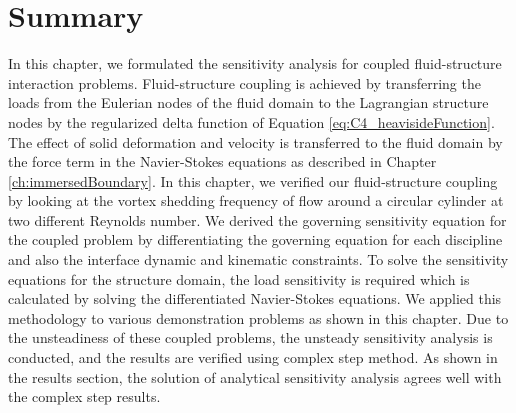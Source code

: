 \section{Summary}
In this chapter, we formulated the sensitivity analysis for coupled fluid-structure interaction problems. Fluid-structure coupling is achieved by transferring the loads from the Eulerian nodes of the fluid domain to the Lagrangian structure nodes by the regularized delta function of Equation \eqref{eq:C4_heavisideFunction}. The effect of solid deformation and velocity is transferred to the fluid domain by the force term in the Navier-Stokes equations as described in Chapter \ref{ch:immersedBoundary}. In this chapter, we verified our fluid-structure coupling by looking at the vortex shedding frequency of flow around a circular cylinder at two different Reynolds number. We derived the governing sensitivity equation for the coupled problem by differentiating the governing equation for each discipline and also the interface dynamic and kinematic constraints. To solve the sensitivity equations for the structure domain, the load sensitivity is required which is calculated by solving the differentiated Navier-Stokes equations. We applied this methodology to various demonstration problems as shown in this chapter. Due to the unsteadiness of these coupled problems, the unsteady sensitivity analysis is conducted, and the results are verified using complex step method. As shown in the results section, the solution of analytical sensitivity analysis agrees well with the complex step results.